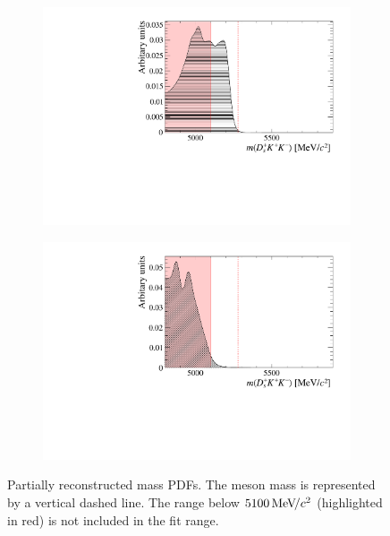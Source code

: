 \begin{figure}[!h]
\begin{subfigure}[t]{0.49\textwidth}
        \includegraphics[width=1.0\textwidth]{figs/B2DsKK/Bs2DsDs_4800_5900_Shape.pdf}
        \caption{\decay{\Bsb}{\Dsp\Dsm} }
        \label{fig:B2DsKK_part_reco_backgrounds_DsDs}
    \end{subfigure}
    \begin{subfigure}[t]{0.49\textwidth}
        \includegraphics[width=1.0\textwidth]{figs/B2DsKK/Bs2DsstDs_4800_5900_Shape.pdf}
        \caption{\decay{\Bsb}{\Dssp\Dsm} }
        \label{fig:B2DsKK_part_reco_backgrounds_DssDs}
    \end{subfigure}
    \caption{Partially reconstructed mass PDFs. The \Bp meson mass is represented by a vertical dashed line. The range below $5100{\mathrm{\,Me\kern -0.1em V\!/}c^2}$ (highlighted in red) is not included in the fit range.}
    \label{fig:B2DsKK_part_reco_backgrounds}   
\end{figure}


